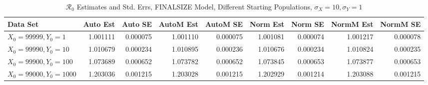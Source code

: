 \documentclass[12pt]{article}
\newcommand{\rr}{\ensuremath{\mathcal{R}_0}}
\begin{document}
\begin{table}[H]
	
	\caption{$\rr$ Estimates and Std. Errs, FINALSIZE Model,
		Different Starting Populations, 
		$\sigma_X = 10, \sigma_Y = 1$}
	\begin{footnotesize}
		\hskip -1.7cm
		\begin{tabular}{l|r|r|r|r|r|r|r|r}
			\hline
			Data Set & Auto Est & Auto SE & AutoM Est & AutoM SE & Norm Est & Norm SE & NormM Est & NormM SE\\
			\hline
			$X_0 = 99999, Y_0 = 1$ & 1.001111 & 0.000075 & 1.001110 & 0.000075 & 1.001081 & 0.000074 & 1.001217 & 0.000078\\
			\hline
			$X_0 = 99990, Y_0 = 10$ & 1.010679 & 0.000234 & 1.010895 & 0.000236 & 1.010676 & 0.000234 & 1.010824 & 0.000235\\
			\hline
			$X_0 = 99900, Y_0 = 100$ & 1.073689 & 0.000652 & 1.073782 & 0.000652 & 1.073845 & 0.000653 & 1.073877 & 0.000653\\
			\hline
			$X_0 = 99000, Y_0 = 1000$ & 1.203036 & 0.001215 & 1.203028 & 0.001215 & 1.202929 & 0.001214 & 1.203088 & 0.001215\\
			\hline
		\end{tabular}
	\end{footnotesize}
\end{table}
\end{document}
